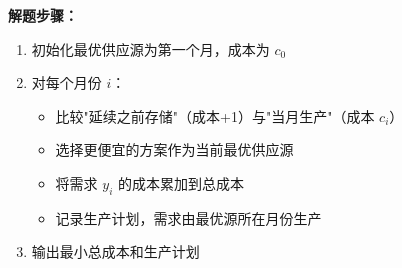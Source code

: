 \textbf{解题步骤：}
\begin{enumerate}
    \item 初始化最优供应源为第一个月，成本为 $c_0$
    \item 对每个月份 $i$：
    \begin{itemize}
        \item 比较"延续之前存储"（成本+1）与"当月生产"（成本 $c_i$）
        \item 选择更便宜的方案作为当前最优供应源
        \item 将需求 $y_i$ 的成本累加到总成本
        \item 记录生产计划，需求由最优源所在月份生产
    \end{itemize}
    \item 输出最小总成本和生产计划
\end{enumerate}
